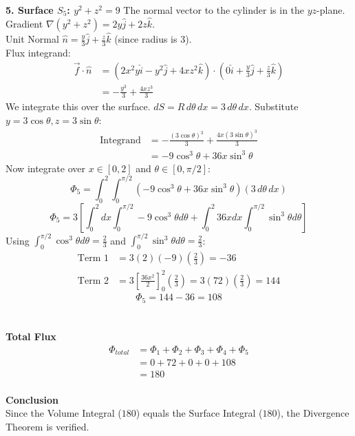\documentclass{article}
\begin{document}
\textbf{5. Surface $S_5$: $y^2+z^2=9$}
The normal vector to the cylinder is in the $yz$-plane.
\\
Gradient $\nabla(y^2+z^2) = 2y\hat{j} + 2z\hat{k}$.
\\
Unit Normal $\hat{n} = \frac{y}{3}\hat{j} + \frac{z}{3}\hat{k}$ (since radius is 3).
\\
Flux integrand:
\begin{align*}
	\vec{f} \cdot \hat{n} & = (2x^2y\hat{i} - y^2\hat{j} + 4xz^2\hat{k}) \cdot \left( 0\hat{i} + \frac{y}{3}\hat{j} + \frac{z}{3}\hat{k} \right) \\
	                      & = -\frac{y^3}{3} + \frac{4xz^3}{3}
\end{align*}
We integrate this over the surface. $dS = R \, d\theta \, dx = 3 \, d\theta \, dx$.
Substitute $y=3\cos\theta, z=3\sin\theta$:
\begin{align*}
	\text{Integrand} & = -\frac{(3\cos\theta)^3}{3} + \frac{4x(3\sin\theta)^3}{3} \\
	                 & = -9\cos^3\theta + 36x\sin^3\theta
\end{align*}
Now integrate over $x \in [0,2]$ and $\theta \in [0, \pi/2]$:
\[
	\Phi_5 = \int_0^2 \int_0^{\pi/2} (-9\cos^3\theta + 36x\sin^3\theta) (3 \, d\theta \, dx)
\]
\[
	\Phi_5 = 3 \left[ \int_0^2 dx \int_0^{\pi/2} -9\cos^3\theta d\theta + \int_0^2 36x dx \int_0^{\pi/2} \sin^3\theta d\theta \right]
\]
Using $\int_0^{\pi/2} \cos^3\theta d\theta = \frac{2}{3}$ and $\int_0^{\pi/2} \sin^3\theta d\theta = \frac{2}{3}$:
\begin{align*}
	\text{Term 1} & = 3(2)(-9)\left(\frac{2}{3}\right) = -36                                                           \\
	\text{Term 2} & = 3\left[\frac{36x^2}{2}\right]_0^2 \left(\frac{2}{3}\right) = 3(72)\left(\frac{2}{3}\right) = 144
\end{align*}
\[
	\Phi_5 = 144 - 36 = 108
\]
\\
\\
\textbf{Total Flux}
\begin{align*}
	\Phi_{total} & = \Phi_1 + \Phi_2 + \Phi_3 + \Phi_4 + \Phi_5 \\
	             & = 0 + 72 + 0 + 0 + 108                       \\
	             & = 180
\end{align*}
\\
\textbf{Conclusion}
\\
Since the Volume Integral ($180$) equals the Surface Integral ($180$), the
Divergence Theorem is verified.
\end{document}

